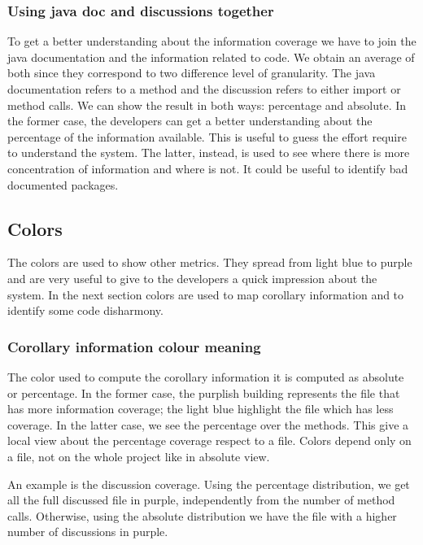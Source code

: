 \documentclass[]{usiinfbachelorproject}
\begin{document}
\subsubsection{Using java doc and discussions together}

To get a better understanding about the information coverage we have to join the java documentation and the information related to code. We obtain an average of both since they correspond to two difference level of granularity. The java documentation refers to a method and the discussion refers to either import or method calls. We can show the result in both ways: percentage and absolute.
In the former case, the developers can get a better understanding about the percentage of the information available. This is useful to guess the effort require to understand the system. The latter, instead, is used to see where there is more concentration of information and where is not. It could be useful to identify  bad documented packages.

  


\subsection{Colors}
The colors are used to show other metrics. They spread from light blue to purple and are very useful to give to the developers a quick impression about the system. In the next section colors are used to map corollary information and to identify some code disharmony.


\subsubsection{Corollary information colour meaning}
The color used to compute the corollary information it is computed as absolute or percentage. In the former case, the purplish building represents the file that has more information coverage; the light blue highlight the file which has less coverage. In the latter case, we see the percentage over the methods. This give a local view about the percentage coverage respect to a file.  Colors depend only on a file, not on the whole project like in absolute view.

An example is the discussion coverage. Using the percentage distribution, we get all the full discussed file in purple, independently from the number of method calls. Otherwise, using the absolute distribution we have the file with a higher number of discussions in purple.
\end{document}
